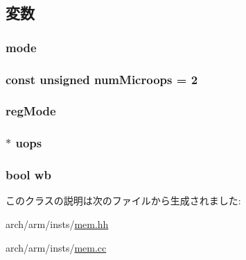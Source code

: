 \subsection{変数}
\hypertarget{classArmISA_1_1SrsOp_a273a5f1b71915654f056568ae963b5de}{
\subsubsection[{mode}]{ {\bf mode}}}
\label{classArmISA_1_1SrsOp_a273a5f1b71915654f056568ae963b5de}
\hypertarget{classArmISA_1_1SrsOp_a0e01007cc580b30b13363bf037eb849f}{
\subsubsection[{numMicroops}]{\setlength{\rightskip}{0pt plus 5cm}const unsigned {\bf numMicroops} = 2}}
\label{classArmISA_1_1SrsOp_a0e01007cc580b30b13363bf037eb849f}
\hypertarget{classArmISA_1_1SrsOp_a12db2fba9f7d55fc14b04e70c215b68c}{
\subsubsection[{regMode}]{ {\bf regMode}}}
\label{classArmISA_1_1SrsOp_a12db2fba9f7d55fc14b04e70c215b68c}
\hypertarget{classArmISA_1_1SrsOp_a4b95b3465f3133312f95fdaf25b90b36}{
\subsubsection[{uops}]{$\ast$ {\bf uops}}}
\label{classArmISA_1_1SrsOp_a4b95b3465f3133312f95fdaf25b90b36}
\hypertarget{classArmISA_1_1SrsOp_a93541ed16711b2c9c53cf093b675d90b}{
\subsubsection[{wb}]{\setlength{\rightskip}{0pt plus 5cm}bool {\bf wb}}}
\label{classArmISA_1_1SrsOp_a93541ed16711b2c9c53cf093b675d90b}


このクラスの説明は次のファイルから生成されました:\begin{DoxyCompactItemize}
\item 
arch/arm/insts/\hyperlink{arm_2insts_2mem_8hh}{mem.hh}\item 
arch/arm/insts/\hyperlink{arm_2insts_2mem_8cc}{mem.cc}\end{DoxyCompactItemize}
